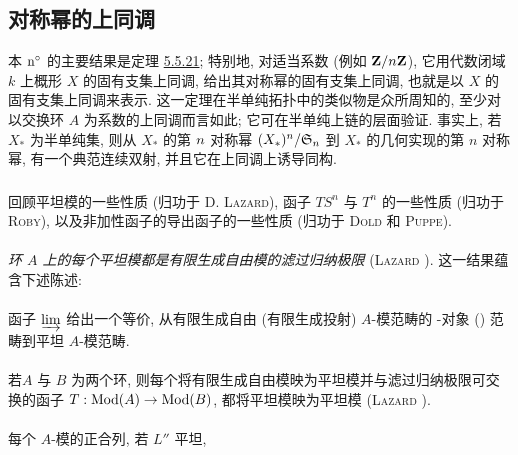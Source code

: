 \subsection{对称幂的上同调}
\pageoriginale

本 ${\rm n^{\circ}}$ 的主要结果是定理 \hyperref[XVII.thm5.5.21]{5.5.21}; 特别地, 对适当系数 (例如 $\mathbf{Z}/n\mathbf{Z}$), 它用代数闭域 $k$ 上概形 $X$ 的固有支集上同调, 给出其对称幂的固有支集上同调, 也就是以 $X$ 的固有支集上同调来表示. 这一定理在半单纯拓扑中的类似物是众所周知的, 至少对以交换环 $A$ 为系数的上同调而言如此; 它可在半单纯上链的层面验证. 事实上, 若 $X_{\ast}$ 为半单纯集, 则从 $X_{\ast}$ 的第 $n$ 对称幂 $(X_{\ast})^n/\mathfrak{S}_n$ 到 $X_{\ast}$ 的几何实现的第 $n$ 对称幂, 有一个典范连续双射, 并且它在上同调上诱导同构.

\subsubsection{}
回顾平坦模的一些性质 (归功于 \textsc{D. Lazard}), 函子 $TS^n$ 与 $T^n$ 的一些性质 (归功于 \textsc{Roby}), 以及非加性函子的导出函子的一些性质 (归功于 \textsc{Dold} 和 \textsc{Puppe}).

\paragraph{}
\emph{环 $A$ 上的每个平坦模都是有限生成自由模的滤过归纳极限} (\textsc{Lazard} \cite[I 1.2]{sga4.exp.XVII.bib.La}). 这一结果蕴含下述陈述:

\paragraph{}
函子 $\varinjlim$ 给出一个等价, 从有限生成自由 (\resp 有限生成投射) $A$-模范畴的 \iInd-对象 () 范畴到平坦 $A$-模范畴.

\paragraph{}
若\pageoriginale $A$ 与 $B$ 为两个环, 则每个将有限生成自由模映为平坦模并与滤过归纳极限可交换的函子 $T:\operatorname{Mod}(A)\rightarrow\operatorname{Mod}(B)$, 都将平坦模映为平坦模 (\textsc{Lazard} \cite[I 1.5]{sga4.exp.XVII.bib.La}).

\paragraph{}
每个 $A$-模的正合列, 若 $L''$ 平坦,

